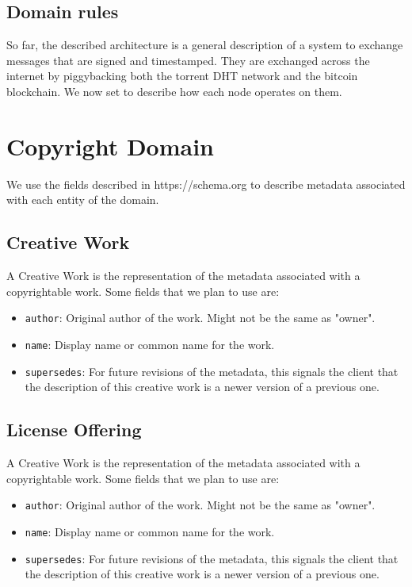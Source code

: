 \documentclass[12pt]{article}
\begin{document}
\subsection{Domain rules}

So far, the described architecture is a general description of a system to exchange messages that are signed and timestamped. They are exchanged across the internet by piggybacking both the torrent DHT network and the bitcoin blockchain. We now set to describe how each node operates on them. 

\section{Copyright Domain}

We use the fields described in https://schema.org to describe metadata associated with each entity of the domain.

\subsection{Creative Work}

A Creative Work is the representation of the metadata associated with a copyrightable work. Some fields that we plan to use are:
\begin{itemize}
  \item \texttt{author}: Original author of the work. Might not be the same as "owner".
  \item \texttt{name}: Display name or common name for the work.
  \item \texttt{supersedes}: For future revisions of the metadata, this signals the client that the description of this creative work is a newer version of a previous one.
\end{itemize}

\subsection{License Offering}

A Creative Work is the representation of the metadata associated with a copyrightable work. Some fields that we plan to use are:
\begin{itemize}
  \item \texttt{author}: Original author of the work. Might not be the same as "owner".
  \item \texttt{name}: Display name or common name for the work.
  \item \texttt{supersedes}: For future revisions of the metadata, this signals the client that the description of this creative work is a newer version of a previous one.
\end{itemize}
\end{document}

